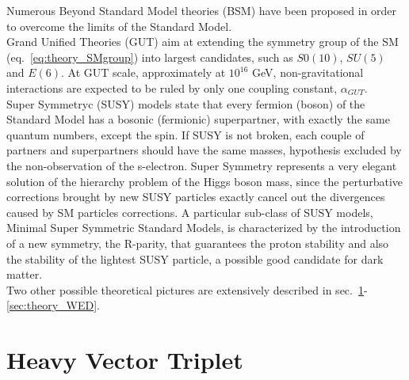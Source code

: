 Numerous Beyond Standard Model theories (BSM) have been proposed in order to overcome the limits of the Standard Model.\\
Grand Unified Theories (GUT) aim at extending the symmetry group of the SM (eq.~\ref{eq:theory_SMgroup}) into largest candidates, such as $S0(10)$, $SU(5)$ and $E(6)$. At GUT scale, approximately at $10^{16}$ GeV, non-gravitational interactions are expected to be ruled by only one coupling constant, $\alpha_{GUT}$.\\%
Super Symmetryc (SUSY) models state that every fermion (boson) of the Standard Model has a bosonic (fermionic) superpartner, with exactly the same quantum numbers, except the spin. If SUSY is not broken, each couple of partners and superpartners should have the same masses, hypothesis excluded by the non-observation of the s-electron. Super Symmetry represents a very elegant solution of the hierarchy problem of the Higgs boson mass, since the perturbative corrections brought by new SUSY particles exactly cancel out the divergences caused by SM particles corrections. A particular sub-class of SUSY models, Minimal Super Symmetric Standard Models, is characterized by the introduction of a new symmetry, the R-parity, that guarantees the proton stability and also the stability of the lightest SUSY particle, a possible good candidate for dark matter.
\\

Two other possible theoretical pictures are extensively described in sec.~\ref{sec:theory_HVT}-\ref{sec:theory_WED}.

\newpage

\section{Heavy Vector Triplet}
\label{sec:theory_HVT}

